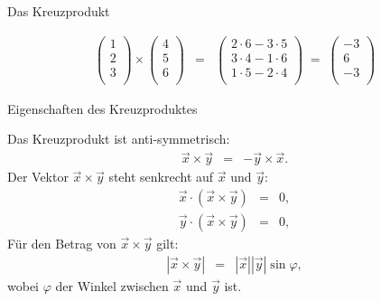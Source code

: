 \documentclass[german]{beamer}
\newcommand{\bq}{\begin{eqnarray*}}
\newcommand{\eq}{\end{eqnarray*}}
\begin{document}
\begin{frame}{Das Kreuzprodukt}

\begin{example}
\bq
 \left( \begin{array}{c} 1 \\ 2 \\ 3 \\ \end{array} \right)
 \times
 \left( \begin{array}{c} 4 \\ 5 \\ 6 \\ \end{array} \right)
  & = &
 \left( \begin{array}{c} 2 \cdot 6 - 3 \cdot 5 \\ 3 \cdot 4 - 1 \cdot 6 \\ 1 \cdot 5 - 2 \cdot 4 \\ \end{array} \right)
 \; = \;
 \left( \begin{array}{r} -3 \\ 6 \\ -3 \\ \end{array} \right)
\eq
\end{example}

\end{frame}

\begin{frame}{Eigenschaften des Kreuzproduktes}

Das Kreuzprodukt ist anti-symmetrisch:
\bq
 \vec{x} \times \vec{y} & = & - \vec{y} \times \vec{x}.
\eq
Der Vektor $\vec{x} \times \vec{y}$ steht senkrecht auf $\vec{x}$ und $\vec{y}$:
\bq
 \vec{x} \cdot \left( \vec{x} \times \vec{y} \right) & = & 0,
 \nonumber \\
 \vec{y} \cdot \left( \vec{x} \times \vec{y} \right) & = & 0,
\eq
F\"ur den Betrag von $\vec{x} \times \vec{y}$ gilt:
\bq
 \left| \vec{x} \times \vec{y} \right | & = &
 \left| \vec{x} \right| \left| \vec{y} \right| \sin \varphi,
\eq
wobei $\varphi$ der Winkel zwischen $\vec{x}$ und $\vec{y}$ ist.

\end{frame}
\end{document}

